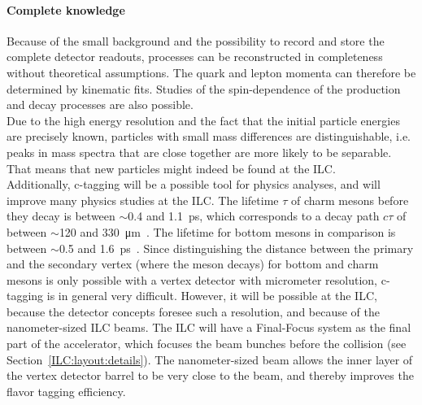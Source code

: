 \paragraph{Complete knowledge}
Because of the small background and the possibility to record and store the complete detector readouts, processes can be reconstructed in completeness without theoretical assumptions.
The quark and lepton momenta can therefore be determined by kinematic fits.
Studies of the spin-dependence of the production and decay processes are also possible.\\
Due to the high energy resolution and the fact that the initial particle energies are precisely known, particles with small mass differences are distinguishable, i.e. peaks in mass spectra that are close together are more likely to be separable.
That means that new particles might indeed be found at the ILC.
\\Additionally, c-tagging will be a possible tool for physics analyses, and will improve many physics studies at the ILC.
The lifetime $\tau$ of charm mesons before they decay is between $\sim$0.4 and \SI{1.1}{\pico\second}, which corresponds to a decay path $c\tau$ of between $\sim$120 and \SI{330}{\micro\meter}~\cite[p. 1044ff]{PDG}.
The lifetime for bottom mesons in comparison is between $\sim$0.5 and \SI{1.6}{\pico\second}~\cite[p. 1137ff]{PDG}.
Since distinguishing the distance between the primary and the secondary vertex (where the meson decays) for bottom and charm mesons is only possible with a vertex detector with micrometer resolution, c-tagging is in general very difficult.
However, it will be possible at the ILC, because the detector concepts foresee such a resolution, and because of the nanometer-sized ILC beams.
The ILC will have a Final-Focus system as the final part of the accelerator, which focuses the beam bunches before the collision (see Section~\ref{ILC:layout:details}).
The nanometer-sized beam allows the inner layer of the vertex detector barrel to be very close to the beam, and thereby improves the flavor tagging efficiency.

